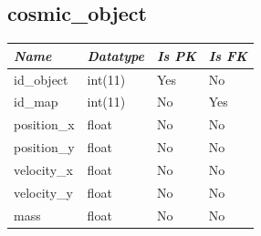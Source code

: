 \subsection{cosmic\_object}

\begin{table}[h!]
\centering
\small

    \begin{tabular}{ | m{} | m{} | m{} | m{} | }
    \hline
        \cellcolor{blue!25}\textbf{\textit{Name}} &

        \cellcolor{blue!25}\textbf{\textit{Datatype}} &
        \cellcolor{blue!25}\textbf{\textit{Is PK}} &
        \cellcolor{blue!25}\textbf{\textit{Is FK}} \\
    \hline
    \hline
        id\_object & int(11) & Yes & No \\
    \hline
        id\_map & int(11) & No & Yes \\
    \hline
        position\_x & float & No & No \\
    \hline
        position\_y & float & No & No \\
    \hline
        velocity\_x & float & No & No \\
    \hline
        velocity\_y & float & No & No \\
    \hline
        mass & float & No & No \\
    \hline
    \end{tabular}

\end{table}

